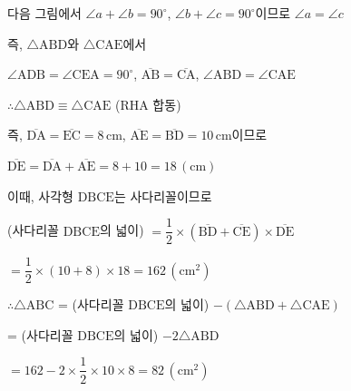 다음 그림에서 $\angle a + \angle b = 90^\circ$, $\angle b + \angle c = 90^\circ$이므로 $\angle a = \angle c$

즉, $\triangle\mathrm{ABD}$와 $\triangle\mathrm{CAE}$에서

$\angle\mathrm{ADB} = \angle\mathrm{CEA} = 90^\circ$, $\overline{\mathrm{AB}} = \overline{\mathrm{CA}}$, $\angle\mathrm{ABD} = \angle\mathrm{CAE}$

$\therefore \triangle\mathrm{ABD} \equiv \triangle\mathrm{CAE}$ (RHA 합동)

즉, $\overline{\mathrm{DA}} = \overline{\mathrm{EC}} = 8\,\mathrm{cm}$, $\overline{\mathrm{AE}} = \overline{\mathrm{BD}} = 10\,\mathrm{cm}$이므로

$\overline{\mathrm{DE}} = \overline{\mathrm{DA}} + \overline{\mathrm{AE}} = 8 + 10 = 18\,(\mathrm{cm})$

이때, 사각형 $\mathrm{DBCE}$는 사다리꼴이므로

(사다리꼴 $\mathrm{DBCE}$의 넓이) $= \dfrac{1}{2}\times (\overline{\mathrm{BD}} + \overline{\mathrm{CE}})\times \overline{\mathrm{DE}}$

$= \dfrac{1}{2}\times (10 + 8)\times 18 = 162\,(\mathrm{cm}^2)$

$\therefore \triangle\mathrm{ABC}$ = (사다리꼴 $\mathrm{DBCE}$의 넓이) $- (\triangle\mathrm{ABD} + \triangle\mathrm{CAE})$

= (사다리꼴 $\mathrm{DBCE}$의 넓이) $- 2\triangle\mathrm{ABD}$

$= 162 - 2\times \dfrac{1}{2}\times 10\times 8 = 82\,(\mathrm{cm}^2)$
